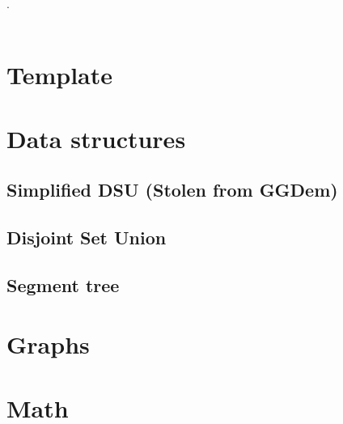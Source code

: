 

\def\title{Universidad Autonoma de Ciudad Juarez - First to Penalty}
.\\[0.2cm]
 \\[0.5cm]
\tableofcontents\newpage

\section{Template}
\section{Data structures}
\subsection{Simplified DSU (Stolen from GGDem)}
\subsection{Disjoint Set Union}
\subsection{Segment tree}


\section{Graphs}


\section{Math}
